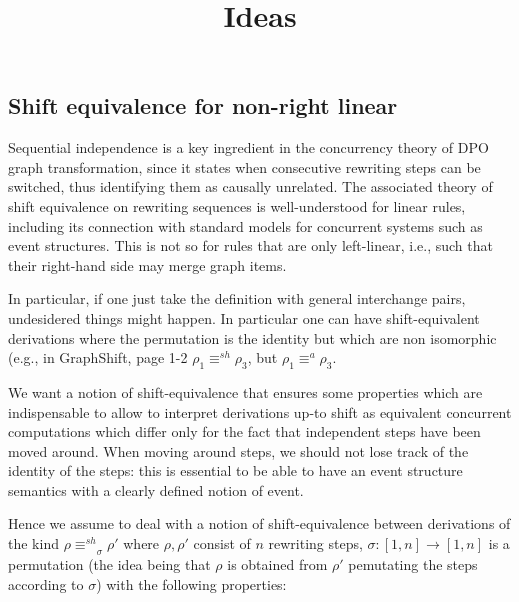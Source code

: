 \documentclass{llncs}
\title{Ideas}
\newcommand{\interval}[2][1]{\ensuremath{[{#1},{#2}]}}
\newcommand{\shifteq}[1][]{\ensuremath{\mathrel{{\equiv}^\mathit{sh}_{#1}}}}
\begin{document}
\maketitle



  
\subsection*{Shift equivalence for non-right linear}

Sequential independence is a key ingredient in the concurrency theory of DPO graph transformation, since it states when consecutive rewriting steps can be switched, thus 
identifying them as causally unrelated. The associated theory of shift equivalence on rewriting sequences is well-understood for linear rules, including its 
connection with standard models for concurrent systems such as event structures. 
%
This is not so for rules that are only left-linear, i.e., such that
their right-hand side may merge graph items.


In particular, if one just take the definition with general
interchange pairs, undesidered things might happen. In particular one
can have shift-equivalent derivations where the permutation is the
identity but which are non isomorphic (e.g., in GraphShift, page 1-2
$\rho_1 \shifteq \rho_3$, but $\rho_1 \equiv^{a} \rho_3$.
  
We want a notion of shift-equivalence that ensures some properties
which are indispensable to allow to interpret derivations up-to shift
as equivalent concurrent computations which differ only for the fact
that independent steps have been moved around. When moving around steps, we should not lose track of the identity of the steps: this is essential to be able to have an event structure semantics with a clearly defined notion of event.


Hence we assume to deal
with a notion of shift-equivalence between derivations of the kind
$\rho \shifteq_\sigma \rho'$ where $\rho, \rho'$ consist of $n$
rewriting steps, $\sigma: \interval{n} \to \interval{n}$ is a
permutation (the idea being that $\rho$ is obtained from $\rho'$
pemutating the steps according to $\sigma$) with the following
properties:
\end{document}
